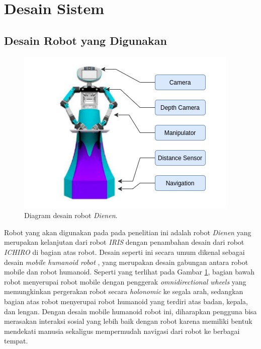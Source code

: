 \section{Desain Sistem}
\label{sec:desainsistem}

\subsection{Desain Robot yang Digunakan}

\begin{figure} [ht]
  \centering
  \includegraphics[scale=0.6]{gambar/desainrobot.png}
  \caption{Diagram desain robot \emph{Dienen}.}
  \label{fig:desainrobot}
\end{figure}

Robot yang akan digunakan pada pada penelitian ini adalah robot \emph{Dienen} yang merupakan kelanjutan dari robot \emph{IRIS} \citep{dikairono2020}\citep{zanuar2019} dengan penambahan desain dari robot \emph{ICHIRO} \citep{muhtadin2019} di bagian atas robot.
Desain seperti ini secara umum dikenal sebagai desain \emph{mobile humanoid robot} \citep{mohamed2012}, yang merupakan desain gabungan antara robot mobile dan robot humanoid.
Seperti yang terlihat pada Gambar \ref{fig:desainrobot}, bagian bawah robot menyerupai robot mobile dengan penggerak \emph{omnidirectional wheels} yang memungkinkan pergerakan robot secara \emph{holonomic} ke segala arah\citep{oliveira2008}, sedangkan bagian atas robot menyerupai robot humanoid yang terdiri atas badan, kepala, dan lengan.
Dengan desain mobile humanoid robot ini, diharapkan pengguna bisa merasakan interaksi sosial yang lebih baik dengan robot karena memiliki bentuk mendekati manusia \citep{rossi2018} sekaligus mempermudah navigasi dari robot ke berbagai tempat.

